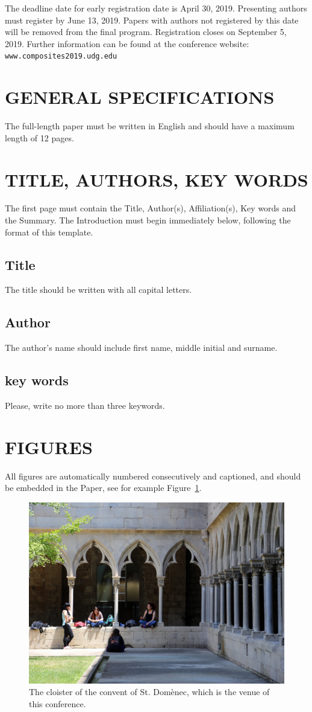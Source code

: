 \documentclass[12pt,a4paper]{article}
\begin{document}
The deadline date for early registration date is April 30, 2019. Presenting authors must register by June 13, 2019. Papers with authors not registered by this date will be removed from the final program.
Registration closes on September 5, 2019. Further information can be found at the conference website: \texttt{www.composites2019.udg.edu}

\section{GENERAL SPECIFICATIONS}
The full-length paper must be written in English and should have a maximum length of 12 pages.

\section{TITLE, AUTHORS, KEY WORDS}
The first page must contain the Title, Author(s), Affiliation(s), Key words and the Summary. The Introduction must begin immediately below, following the format of this template.

\subsection{Title}
The title should be written with all capital letters.
\subsection{Author}
The author's name should include first name, middle initial and surname.
\subsection{key words}
Please, write no more than three keywords.

\section{FIGURES}

All figures are automatically numbered consecutively and captioned, and should be embedded in the Paper, see for example Figure~\ref{fig:Claustre}.

\begin{figure}[!h]
 \centering\includegraphics[width=0.65\linewidth]{Claustre.pdf}
 \caption{The cloister of the convent of St. Domènec, which is the venue of this conference.}
 \label{fig:Claustre}
\end{figure}
\end{document}

